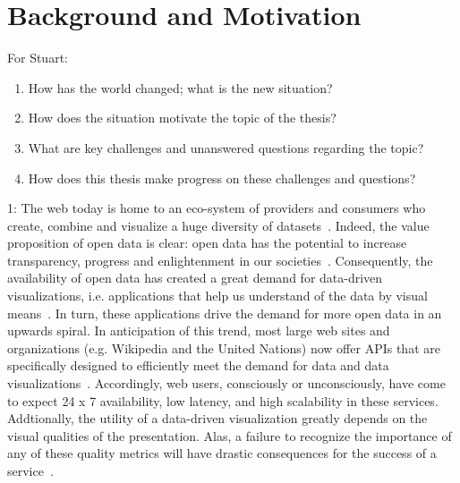 \documentclass[11pt, oneside]{report}
\begin{document}
\section{Background and Motivation}
\label{sec:introduction:background:and:motivation}

For Stuart:

\begin{enumerate}
\item How has the world changed; what is the new situation?
\item How does the situation motivate the topic of the thesis?
\item What are key challenges and unanswered questions regarding the topic?
\item How does this thesis make progress on these challenges and questions?
\end{enumerate}


1: The web today is home to an eco-system of providers and consumers who create, combine and visualize a huge diversity of datasets~\cite{wikipedia,worldbank,unstats,data:gov, data:co:uk,gst,openstreetmap}. Indeed, the value proposition of open data is clear: open data has the potential to increase transparency, progress and enlightenment in our societies~\cite{hans:rosling, offentlige:data:i:spil}. Consequently, the availability of open data has created a great demand for data-driven visualizations, i.e. applications that help us understand of the data by visual means~\cite{nytimes,guardian}. In turn, these applications drive the demand for more open data in an upwards spiral. In anticipation of this trend, most large web sites and organizations (e.g. Wikipedia and the United Nations) now offer APIs that are specifically designed to efficiently meet the demand for data and data visualizations~\cite{wikipediaapi,unapi}. Accordingly, web users, consciously or unconsciously, have come to expect 24 x 7 availability, low latency, and high scalability in these services. Addtionally, the utility of a data-driven visualization greatly depends on the visual qualities of the presentation. Alas, a failure to recognize the importance of any of these quality metrics will have drastic consequences for the success of a service~\cite{usability:study, performance:study}.
\end{document}

